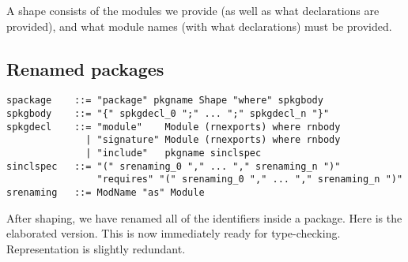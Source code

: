 \documentclass{article}
\newcommand{\Red}[1]{{\color{red} #1}}
\begin{document}
A shape consists of the modules we provide (as well as what declarations
are provided), and what module names (with what declarations) must
be provided.

\subsection{Renamed packages}

\begin{verbatim}
spackage    ::= "package" pkgname Shape "where" spkgbody
spkgbody    ::= "{" spkgdecl_0 ";" ... ";" spkgdecl_n "}"
spkgdecl    ::= "module"    Module (rnexports) where rnbody
              | "signature" Module (rnexports) where rnbody
              | "include"   pkgname sinclspec
sinclspec   ::= "(" srenaming_0 "," ... "," srenaming_n ")"
                "requires" "(" srenaming_0 "," ... "," srenaming_n ")"
srenaming   ::= ModName "as" Module
\end{verbatim}

After shaping, we have renamed all of the identifiers inside a package.
Here is the elaborated version.  This is now immediately ready for
type-checking.  \Red{Representation is slightly redundant.}
\end{document}
